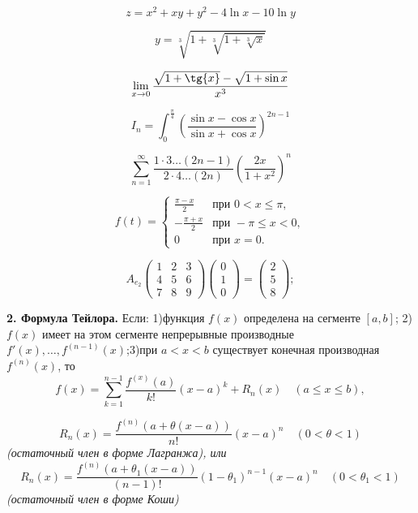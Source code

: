 \documentclass[a4paper, 12pt]{article}
\begin{document}
$$
z=x^2+xy+y^2-4\ln {x}-10\ln {y}
$$

$$
y=\sqrt[3]{1+\sqrt[3]{1+\sqrt[3]{x}}}
$$

$$
\lim_{x \to 0}\frac{\sqrt{\mathstrut 1+\tg{x}}-\sqrt{\mathstrut 1+\sin{x}}}{x^3}
$$

$$
I_n= \int_{0}^{\frac{\pi}{4}} \left(\frac{\sin{x}-\cos{x}}{\sin{x}+\cos{x}}\right)^{2n-1}
$$

$$
\sum \limits_{n=1}^\infty \frac{1\cdot3\ldots(2n-1)}{2\cdot4\ldots(2n)}\left(\frac{2x}{1+x^2}\right)^n
$$

$$
f{(t)}=\begin{cases}
\frac{\pi-x}{2} & \text{при } 0 < x \leqslant \pi, \\
-\frac{\pi+x}{2} & \text{при } -\pi \leqslant x < 0,  \\
0 & \text{при } x=0.
\end{cases}
$$

$$
A_{e_2} \begin{pmatrix}
1 & 2 & 3 \\
4 & 5 & 6 \\
7 & 8 & 9
\end{pmatrix}\begin{pmatrix}
0 \\
1 \\
0
\end{pmatrix}=\begin{pmatrix}
2 \\
5 \\
8
\end{pmatrix};
$$

\textbf{2. Формула Тейлора.} Если: 1)функция $f(x)$ определена на сегменте $[a,b]$; 2)$f(x)$ имеет на этом сегменте непрерывные производные $f'(x), \ldots, f^{(n-1)}(x)$;3)при $a<x<b$ существует конечная производная $f^{(n)}(x)$, то 
$$
f(x) = \sum \limits_{k=1}^{n-1} \frac{f^{(x)}(a)}{k!}\left(x-a\right)^k+R_n(x) \quad (a \leqslant x \leqslant b),
$$

$$
R_n(x)= \frac{f^{(n)}\left(a+\theta \left(x-a\right)\right)}{n!}\left(x-a\right)^n \quad (0<\theta<1)
$$
\it{(остаточный член в форме Лагранжа), или}\rm
$$
R_n(x)= \frac{f^{(n)}\left(a+\theta_1 \left(x-a\right)\right)}{(n-1)!}\left(1-\theta_1\right)^{n-1}\left(x-a\right)^n \quad (0<\theta_1<1)
$$
\it{(остаточный член в форме Коши)}\rm
\end{document}
